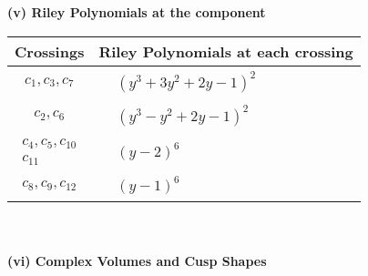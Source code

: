 \documentclass[1p]{elsarticle_modified}
\theoremstyle{definition}
\begin{document}
\newpage\renewcommand{\arraystretch}{1}
\flushleft \textbf{(v) Riley Polynomials at the component}\newline \\
\begin{tabular}{m{50pt}|m{274pt}}
Crossings & \hspace{64pt}Riley Polynomials at each crossing \\
\hline $$\begin{aligned}c_{1},c_{3},c_{7}\end{aligned}$$&$\begin{aligned}
&(y^3+3 y^2+2 y-1)^2
\end{aligned}$\\
\hline $$\begin{aligned}c_{2},c_{6}\end{aligned}$$&$\begin{aligned}
&(y^3- y^2+2 y-1)^2
\end{aligned}$\\
\hline $$\begin{aligned}c_{4},c_{5},c_{10}\\c_{11}\end{aligned}$$&$\begin{aligned}
&(y-2)^6
\end{aligned}$\\
\hline $$\begin{aligned}c_{8},c_{9},c_{12}\end{aligned}$$&$\begin{aligned}
&(y-1)^6
\end{aligned}$\\
\hline
\end{tabular}\\~\\
\newpage\flushleft \textbf{(vi) Complex Volumes and Cusp Shapes}
\end{document}
